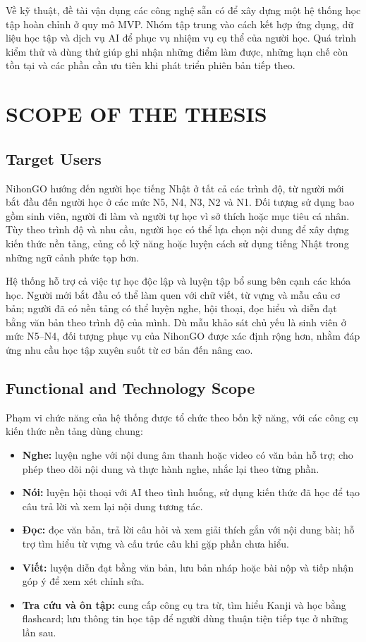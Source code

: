 Về kỹ thuật, đề tài vận dụng các công nghệ sẵn có để xây dựng một hệ thống học tập hoàn chỉnh ở quy mô MVP. Nhóm tập trung vào cách kết hợp ứng dụng, dữ liệu học tập và dịch vụ AI để phục vụ nhiệm vụ cụ thể của người học. Quá trình kiểm thử và dùng thử giúp ghi nhận những điểm làm được, những hạn chế còn tồn tại và các phần cần ưu tiên khi phát triển phiên bản tiếp theo.

\section{SCOPE OF THE THESIS}

\subsection{Target Users}

NihonGO hướng đến người học tiếng Nhật ở tất cả các trình độ, từ người mới bắt đầu đến người học ở các mức N5, N4, N3, N2 và N1. Đối tượng sử dụng bao gồm sinh viên, người đi làm và người tự học vì sở thích hoặc mục tiêu cá nhân. Tùy theo trình độ và nhu cầu, người học có thể lựa chọn nội dung để xây dựng kiến thức nền tảng, củng cố kỹ năng hoặc luyện cách sử dụng tiếng Nhật trong những ngữ cảnh phức tạp hơn.

Hệ thống hỗ trợ cả việc tự học độc lập và luyện tập bổ sung bên cạnh các khóa học. Người mới bắt đầu có thể làm quen với chữ viết, từ vựng và mẫu câu cơ bản; người đã có nền tảng có thể luyện nghe, hội thoại, đọc hiểu và diễn đạt bằng văn bản theo trình độ của mình. Dù mẫu khảo sát chủ yếu là sinh viên ở mức N5--N4, đối tượng phục vụ của NihonGO được xác định rộng hơn, nhằm đáp ứng nhu cầu học tập xuyên suốt từ cơ bản đến nâng cao.

\subsection{Functional and Technology Scope}

Phạm vi chức năng của hệ thống được tổ chức theo bốn kỹ năng, với các công cụ kiến thức nền tảng dùng chung:

\begin{itemize}[leftmargin=*, itemsep=4pt]
  \item \textbf{Nghe:} luyện nghe với nội dung âm thanh hoặc video có văn bản hỗ trợ; cho phép theo dõi nội dung và thực hành nghe, nhắc lại theo từng phần.
  \item \textbf{Nói:} luyện hội thoại với AI theo tình huống, sử dụng kiến thức đã học để tạo câu trả lời và xem lại nội dung tương tác.
  \item \textbf{Đọc:} đọc văn bản, trả lời câu hỏi và xem giải thích gắn với nội dung bài; hỗ trợ tìm hiểu từ vựng và cấu trúc câu khi gặp phần chưa hiểu.
  \item \textbf{Viết:} luyện diễn đạt bằng văn bản, lưu bản nháp hoặc bài nộp và tiếp nhận góp ý để xem xét chỉnh sửa.
  \item \textbf{Tra cứu và ôn tập:} cung cấp công cụ tra từ, tìm hiểu Kanji và học bằng flashcard; lưu thông tin học tập để người dùng thuận tiện tiếp tục ở những lần sau.
\end{itemize}

